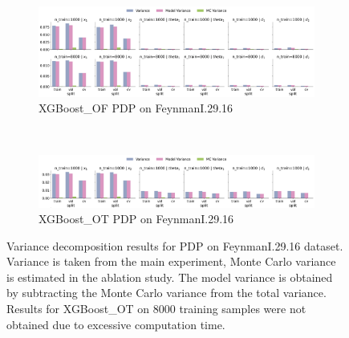 \documentclass[runningheads]{llncs}
\begin{document}
\begin{figure}[htbp]
    \centering
    \begin{subfigure}[b]{0.9\textwidth}
        \includegraphics[width=\textwidth]{img/FeynmanI.29.16-all/variance_decomposition_pdp_XGBoost_OF.png}
        \caption{XGBoost\_OF PDP on FeynmanI.29.16}
    \end{subfigure}
    \\[10pt]
    \vfill
    \begin{subfigure}[b]{0.9\textwidth}
        \includegraphics[width=\textwidth]{img/FeynmanI.29.16-all/variance_decomposition_pdp_XGBoost_OT.png}
        \caption{XGBoost\_OT PDP on FeynmanI.29.16}
    \end{subfigure}
    \caption{Variance decomposition results for PDP on FeynmanI.29.16 dataset. Variance is taken from the
    main experiment, Monte Carlo variance is estimated in the ablation study. The model variance is
    obtained by subtracting the Monte Carlo variance from the total variance. Results for XGBoost\_OT
    on 8000 training samples were not obtained due to excessive computation time.}
    \label{fig:pdp-variance-decomp-feynman}  %
\end{figure}
\end{document}
